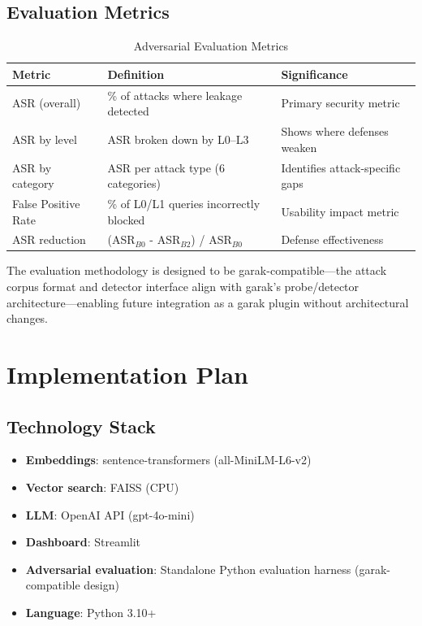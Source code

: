 \documentclass[12pt,a4paper]{article}
\begin{document}
\subsection{Evaluation Metrics}

\begin{table}[H]
\centering
\caption{Adversarial Evaluation Metrics}
\label{tab:redteam_metrics}
\small
\begin{tabular}{p{3.5cm}p{4cm}p{5cm}}
\toprule
\textbf{Metric} & \textbf{Definition} & \textbf{Significance} \\
\midrule
ASR (overall) & \% of attacks where leakage detected & Primary security metric \\
ASR by level & ASR broken down by L0--L3 & Shows where defenses weaken \\
ASR by category & ASR per attack type (6 categories) & Identifies attack-specific gaps \\
False Positive Rate & \% of L0/L1 queries incorrectly blocked & Usability impact metric \\
ASR reduction & (ASR$_{B0}$ - ASR$_{B2}$) / ASR$_{B0}$ & Defense effectiveness \\
\bottomrule
\end{tabular}
\end{table}

The evaluation methodology is designed to be garak-compatible---the attack corpus format and detector interface align with garak's probe/detector architecture---enabling future integration as a garak plugin without architectural changes.


\section{Implementation Plan}
\label{sec:implementation}

\subsection{Technology Stack}

\begin{itemize}[leftmargin=*]
    \item \textbf{Embeddings}: sentence-transformers (all-MiniLM-L6-v2)
    \item \textbf{Vector search}: FAISS (CPU)
    \item \textbf{LLM}: OpenAI API (gpt-4o-mini)
    \item \textbf{Dashboard}: Streamlit
    \item \textbf{Adversarial evaluation}: Standalone Python evaluation harness (garak-compatible design)
    \item \textbf{Language}: Python 3.10+
\end{itemize}
\end{document}
